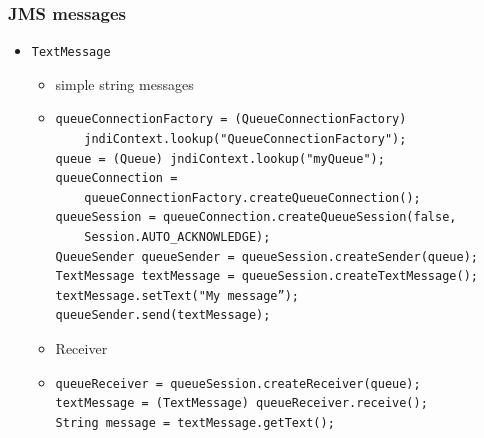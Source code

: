 \documentclass[10pt,xcolor=pdflatex]{beamer}
\begin{document}
\begin{frame}[containsverbatim]\frametitle{JMS messages}
\begin{itemize}
  \item \texttt{TextMessage}
    \vspace*{0.1cm}
	\begin{itemize}
	  \item simple string messages
   	  \vspace*{0.1cm}
	  \item[] \begin{footnotesize}\begin{verbatim}
queueConnectionFactory = (QueueConnectionFactory)
    jndiContext.lookup("QueueConnectionFactory");
queue = (Queue) jndiContext.lookup("myQueue");
queueConnection = 
    queueConnectionFactory.createQueueConnection();
queueSession = queueConnection.createQueueSession(false, 
    Session.AUTO_ACKNOWLEDGE);
QueueSender queueSender = queueSession.createSender(queue);
TextMessage textMessage = queueSession.createTextMessage();
textMessage.setText("My message”);
queueSender.send(textMessage);
\end{verbatim}\end{footnotesize}
    \vspace*{0.1cm}
    \item Receiver
    \vspace*{0.1cm}
    \item[] \begin{footnotesize}\begin{verbatim}
queueReceiver = queueSession.createReceiver(queue);
textMessage = (TextMessage) queueReceiver.receive();
String message = textMessage.getText();
\end{verbatim}\end{footnotesize} 
  \end{itemize}
\end{itemize}
\end{frame}
\end{document}
